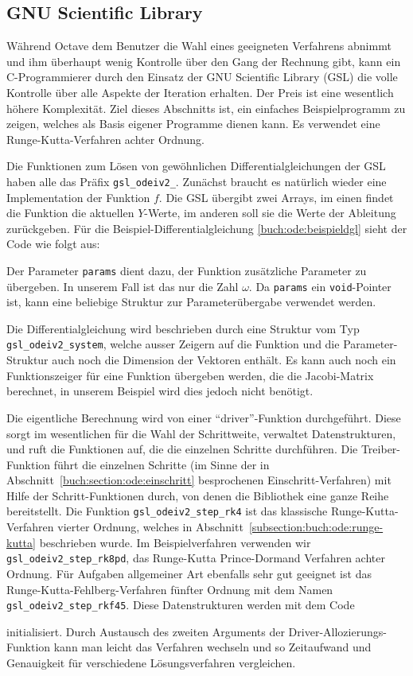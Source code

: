\subsection{GNU Scientific Library}
%
%
Während Octave dem Benutzer die Wahl eines geeigneten Verfahrens abnimmt
und ihm überhaupt wenig Kontrolle über den Gang der Rechnung gibt,
kann ein C-Programmierer durch den Einsatz der GNU Scientific Library (GSL) die
%
volle Kontrolle über alle Aspekte der Iteration erhalten.
Der Preis ist eine wesentlich höhere Komplexität.
Ziel dieses Abschnitts ist, ein einfaches Beispielprogramm zu
zeigen, welches als Basis eigener Programme dienen kann.
Es verwendet eine Runge-Kutta-Verfahren achter Ordnung.

Die Funktionen zum Lösen von gewöhnlichen Differentialgleichungen
der GSL haben alle das Präfix \texttt{gsl\_odeiv2\_}. 
Zunächst braucht es natürlich wieder eine Implementation der
Funktion $f$. 
Die GSL übergibt zwei Arrays, im einen findet die Funktion die aktuellen
$Y$-Werte, im anderen soll sie die Werte der Ableitung zurückgeben.
Für die Beispiel-Differentialgleichung \eqref{buch:ode:beispieldgl}
sieht der Code wie folgt aus:

Der Parameter \texttt{params} dient dazu, der Funktion zusätzliche
Parameter zu übergeben.
In unserem Fall ist das nur die Zahl $\omega$.
Da \texttt{params} ein \texttt{void}-Pointer ist, kann eine beliebige
Struktur zur Parameterübergabe verwendet werden.

Die Differentialgleichung wird beschrieben durch eine Struktur vom Typ
\texttt{gsl\_odeiv2\_system}, welche ausser Zeigern auf die Funktion
und die Parameter-Struktur auch noch die Dimension der Vektoren enthält.
Es kann auch noch ein Funktionszeiger für eine Funktion übergeben
werden, die die Jacobi-Matrix berechnet, in unserem Beispiel wird dies
jedoch nicht benötigt.

Die eigentliche Berechnung wird von einer ``driver''-Funktion durchgeführt.
Diese sorgt im wesentlichen für die Wahl der Schrittweite, verwaltet
Datenstrukturen, und ruft die Funktionen auf, die die einzelnen Schritte
durchführen.
Die Treiber-Funktion führt die einzelnen Schritte (im Sinne der
in Abschnitt~\ref{buch:section:ode:einschritt} besprochenen
Einschritt-Verfahren) mit
Hilfe der Schritt-Funktionen durch, von denen die Bibliothek eine
ganze Reihe bereitstellt.
Die Funktion \texttt{gsl\_odeiv2\_step\_rk4} ist das klassische
Runge-Kutta-Verfahren vierter Ordnung, welches in
Abschnitt~\ref{subsection:buch:ode:runge-kutta}
beschrieben wurde.
Im Beispielverfahren verwenden wir \texttt{gsl\_odeiv2\_step\_rk8pd},
das Runge-Kutta Prince-Dormand Verfahren achter Ordnung.
Für Aufgaben allgemeiner Art ebenfalls sehr gut geeignet ist das
Runge-Kutta-Fehlberg-Verfahren fünfter Ordnung mit dem Namen
\texttt{gsl\_odeiv2\_step\_rkf45}.
Diese Datenstrukturen werden mit dem Code

initialisiert.
Durch Austausch des zweiten Arguments der Driver-Allozierungs-Funktion
kann man leicht das Verfahren wechseln und so Zeitaufwand und Genauigkeit
für verschiedene Lösungsverfahren vergleichen.

